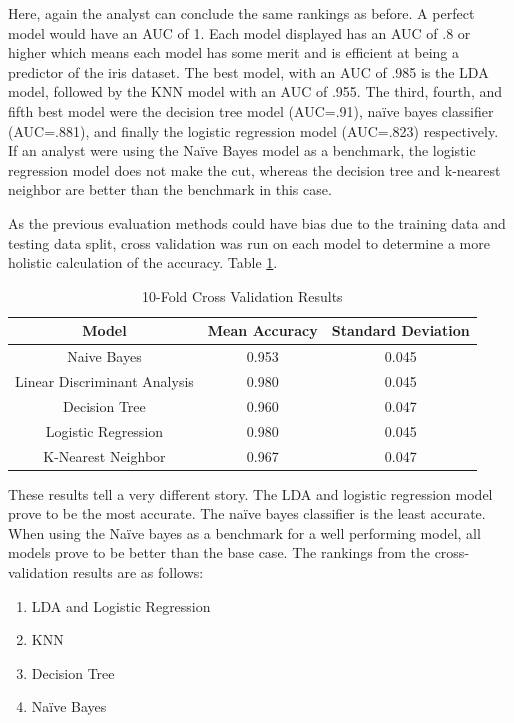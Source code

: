 \documentclass[journal]{IEEEtran}
\begin{document}
Here, again the analyst can conclude the same rankings as before. A perfect model would have an AUC of 1. Each model displayed has an AUC of .8 or higher which means each model has some merit and is efficient at being a predictor of the iris dataset. The best model, with an AUC of .985 is the LDA model, followed by the KNN model with an AUC of .955. The third, fourth, and fifth best model were the decision tree model (AUC=.91), naïve bayes classifier (AUC=.881), and finally the logistic regression model (AUC=.823) respectively. If an analyst were using the Naïve Bayes model as a benchmark, the logistic regression model does not make the cut, whereas the decision tree and k-nearest neighbor are better than the benchmark in this case. 

\vspace{40px}

As the previous evaluation methods could have bias due to the training data and testing data split, cross validation was run on each model to determine a more holistic calculation of the accuracy. Table \ref{table:crossval}. 

\begin{table}[h!]
    \centering
    \begin{tabular}{c | c c}
        Model & Mean Accuracy & Standard Deviation \\
        \hline
        Naive Bayes	& 0.953	& 0.045 \\
        Linear Discriminant Analysis	& 0.980	& 0.045 \\
        Decision Tree	& 0.960	& 0.047 \\
        Logistic Regression	& 0.980	& 0.045 \\
        K-Nearest Neighbor	& 0.967	& 0.047 \\

    \end{tabular}
    \caption{10-Fold Cross Validation Results}
    \label{table:crossval}
\end{table}

These results tell a very different story. The LDA and logistic regression model prove to be the most accurate. The naïve bayes classifier is the least accurate. When using the Naïve bayes as a benchmark for a well performing model, all models prove to be better than the base case. The rankings from the cross-validation results are as follows: 
\begin{enumerate}
    \item LDA and Logistic Regression
    \item KNN
    \item Decision Tree 
    \item Naïve Bayes
\end{enumerate}
\end{document}
